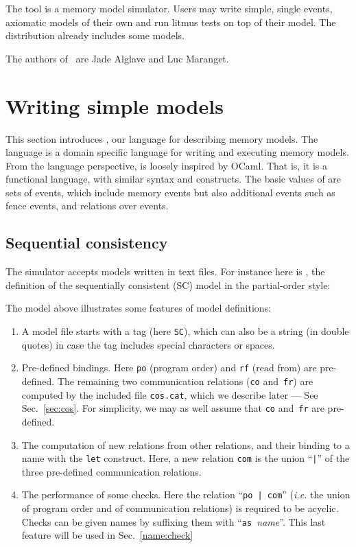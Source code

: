 
The tool \herd{} is a memory model simulator.
Users may write simple, single events,
axiomatic models of their own and run litmus tests on top
of their model.
The \herd{} distribution already includes some models.

The authors of~\herd{} are Jade Alglave and Luc Maranget.


\section{Writing simple models}
This section introduces \cat{}, our language for describing memory models.
The \cat{} language is a domain specific language for writing and executing
memory models. From the language perspective, \cat{} is loosely inspired
by OCaml. That is, it is a functional language, with similar syntax
and constructs.
The basic values of \cat{} are sets of events, which include memory events
but also additional events such as fence events,
and relations over events.


\subsection{Sequential consistency}
The simulator \herd{} accepts models written in text files.
For instance here is ,
the definition of the sequentially consistent (SC) model in the partial-order
style:

The model above illustrates some features of model definitions:
\begin{enumerate}
\item A model file starts with a tag (here \verb+SC+), which can also be a
string (in double quotes) in case the tag includes special characters or spaces.
\item Pre-defined bindings. Here \verb+po+ (program order)
and \texttt{rf} (read from) are pre-defined.
The remaining two communication relations (\texttt{co} and~\texttt{fr})
are computed by the included file \verb+cos.cat+, which we describe later
--- See Sec.~\ref{sec:cos}.
For simplicity, we may as well assume that \verb+co+
and~\verb+fr+ are pre-defined.
\item The computation of new relations from other relations,
and their binding to a name with the \verb+let+ construct.
Here, a new relation \verb+com+ is the union ``\texttt{|}'' of
the three pre-defined communication relations.
\item The performance of some checks. Here the relation ``\verb+po | com+''
(\emph{i.e.} the union of program order  and of  communication
relations) is required to be acyclic.
Checks can be given names by suffixing them with
``\texttt{as~}\textit{name}''.
This last feature will be used in Sec.~\ref{name:check}
\end{enumerate}

